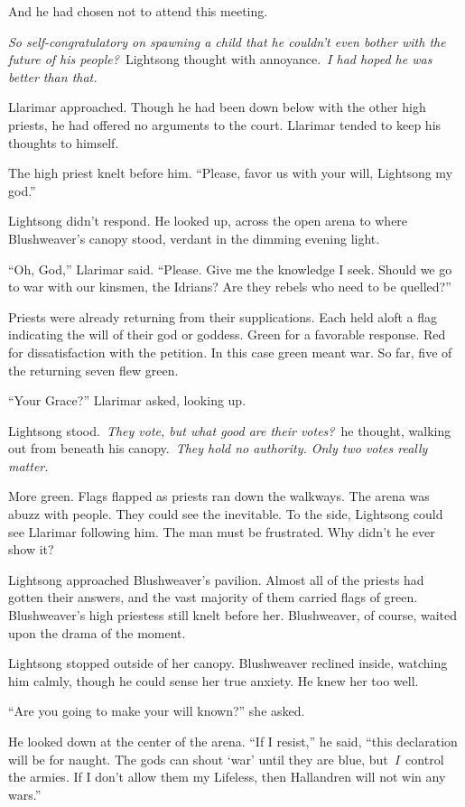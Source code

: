 And he had chosen not to attend this meeting.

\textit{So self-congratulatory on spawning a child that he couldn’t even bother with the future of his people?}~Lightsong thought with annoyance.~\textit{I had hoped he was better than that.}

Llarimar approached. Though he had been down below with the other high priests, he had offered no arguments to the court. Llarimar tended to keep his thoughts to himself.

The high priest knelt before him. “Please, favor us with your will, Lightsong my god.”

Lightsong didn’t respond. He looked up, across the open arena to where Blushweaver’s canopy stood, verdant in the dimming evening light.

“Oh, God,” Llarimar said. “Please. Give me the knowledge I seek. Should we go to war with our kinsmen, the Idrians? Are they rebels who need to be quelled?”

Priests were already returning from their supplications. Each held aloft a flag indicating the will of their god or goddess. Green for a favorable response. Red for dissatisfaction with the petition. In this case green meant war. So far, five of the returning seven flew green.

“Your Grace?” Llarimar asked, looking up.

Lightsong stood.~\textit{They vote, but what good are their votes?}~he thought, walking out from beneath his canopy.~\textit{They hold no authority. Only two votes really matter.}

More green. Flags flapped as priests ran down the walkways. The arena was abuzz with people. They could see the inevitable. To the side, Lightsong could see Llarimar following him. The man must be frustrated. Why didn’t he ever show it?

Lightsong approached Blushweaver’s pavilion. Almost all of the priests had gotten their answers, and the vast majority of them carried flags of green. Blushweaver’s high priestess still knelt before her. Blushweaver, of course, waited upon the drama of the moment.

Lightsong stopped outside of her canopy. Blushweaver reclined inside, watching him calmly, though he could sense her true anxiety. He knew her too well.

“Are you going to make your will known?” she asked.

He looked down at the center of the arena. “If I resist,” he said, “this declaration will be for naught. The gods can shout ‘war’ until they are blue, but~\textit{I}~control the armies. If I don’t allow them my Lifeless, then Hallandren will not win any wars.”

